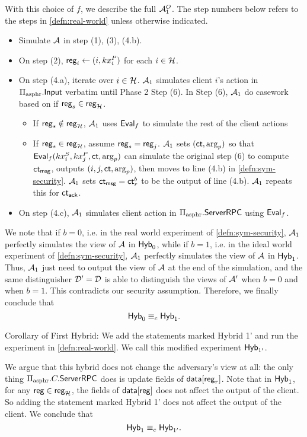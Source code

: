 With this choice of $f$, we describe the full $\mathcal{A}_1^O$. The step numbers below refers to the steps in \cref{defn:real-world} unless otherwise indicated.
\begin{itemize}
    \item Simulate $\mathcal{A}$ in step (1), (3), (4.b).
    \item On step (2), $\mathsf{reg}_i \leftarrow (i, kx_i^{P})$ for each $i \in \mathcal{H}$. 
    \item On step (4.a), iterate over $i \in \mathcal{H}$. $\mathcal{A}_1$ simulates client $i$'s action in $\Pi_{\text{asphr}}.\mathsf{Input}$ verbatim until Phase 2 Step (6). In Step (6), $\mathcal{A}_1$ do casework based on if $\mathsf{reg}_s \in \mathsf{reg}_{\mathcal{H}}$. 
    \begin{itemize}
        \item  If $\mathsf{reg}_s \notin \mathsf{reg}_{\mathcal{H}}$, $\mathcal{A}_1$ uses $\mathsf{Eval}_f$ to simulate the rest of the client actions
        \item  If $\mathsf{reg}_s \in \mathsf{reg}_{\mathcal{H}}$, assume $\mathsf{reg}_s = \mathsf{reg}_j$. $\mathcal{A}_1$ sets $(\mathsf{ct}, \arg_p)$ so that $\mathsf{Eval}_f(kx^S_i, kx^P_j, \mathsf{ct}, \arg_p)$ can simulate the original step (6) to compute $\mathsf{ct}_{\mathsf{msg}}$, outputs $(i, j, \mathsf{ct}, \arg_p)$, then moves to line (4.b) in \cref{defn:sym-security}. $\mathcal{A}_1$ sets $\mathsf{ct}_{\mathsf{msg}} = \mathsf{ct}^b_r$ to be the output of line (4.b). $\mathcal{A}_1$ repeats this for $\mathsf{ct}_{\mathsf{ack}}$.
    \end{itemize}
   
    \item On step (4.c), $\mathcal{A}_1$ simulates client action in $\Pi_{\text{asphr}}.\mathsf{ServerRPC}$ using $\mathsf{Eval}_f$.
\end{itemize}
We note that if $b = 0$, i.e. in the real world experiment of \cref{defn:sym-security}, $\mathcal{A}_1$ perfectly simulates the view of $\mathcal{A}$ in $\mathsf{Hyb}_0$, while if $b = 1$, i.e. in the ideal world experiment of \cref{defn:sym-security}, $\mathcal{A}_1$ perfectly simulates the view of $\mathcal{A}$ in $\mathsf{Hyb}_1$. Thus, $\mathcal{A}_1$ just need to output the view of $\mathcal{A}$ at the end of the simulation, and the same distinguisher $\mathcal{D}' = \mathcal{D}$ is able to distinguish the views of $\mathcal{A}'$ when $b = 0$ and when $b = 1$. This contradicts our security assumption. Therefore, we finally conclude that
$$\mathsf{Hyb}_0 \equiv_c \mathsf{Hyb}_1.$$

Corollary of First Hybrid: We add the statements marked Hybrid 1' and run the experiment in \cref{defn:real-world}. We call this modified experiment $\mathsf{Hyb}_{1'}$.

We argue that this hybrid does not change the adversary's view at all: the only thing $\Pi_{\text{asphr}}.C.\mathsf{ServerRPC}$ does is update fields of $\mathsf{data}[\mathsf{reg}_r]$. Note that in $\mathsf{Hyb}_1$, for any $\mathsf{reg} \in \mathsf{reg}_{\mathcal{H}}$, the fields of $\mathsf{data}[\mathsf{reg}]$ does not affect the output of the client. So adding the statement marked Hybrid 1' does not affect the output of the client. We conclude that
$$\mathsf{Hyb}_1 \equiv_c \mathsf{Hyb}_{1'}.$$

